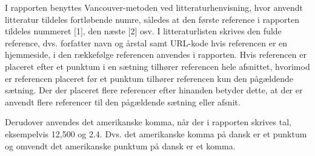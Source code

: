 I rapporten benyttes Vancouver-metoden ved litteraturhenvisning, hvor anvendt litteratur tildeles fortløbende numre, således at den første reference i rapporten tildeles nummeret [1], den næste [2] osv. I litteraturlisten skrives den fulde reference, dvs. forfatter navn og årstal samt URL-kode hvis referencen er en hjemmeside, i den rækkefølge referencen anvendes i rapporten. Hvis referencen er placeret efter et punktum i en sætning tilhører referencen hele afsnittet, hvorimod er referencen placeret før et punktum tilhører referencen kun den pågældende sætning. Der der placeret flere referencer efter hinanden betyder dette, at der er anvendt flere referencer til den pågældende sætning eller afsnit. 

Derudover anvendes det amerikanske komma, når der i rapporten skrives tal, eksempelvis 12,500 og 2.4. Dvs. det amerikanske komma på dansk er et punktum og omvendt det amerikanske punktum på dansk er et komma.    

